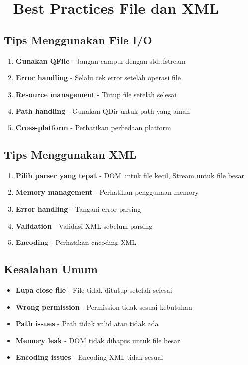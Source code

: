 \section{🔧 Best Practices File dan XML}

\subsection{Tips Menggunakan File I/O}

\begin{enumerate}
\item \textbf{Gunakan QFile} - Jangan campur dengan std::fstream
\item \textbf{Error handling} - Selalu cek error setelah operasi file
\item \textbf{Resource management} - Tutup file setelah selesai
\item \textbf{Path handling} - Gunakan QDir untuk path yang aman
\item \textbf{Cross-platform} - Perhatikan perbedaan platform
\end{enumerate}

\subsection{Tips Menggunakan XML}

\begin{enumerate}
\item \textbf{Pilih parser yang tepat} - DOM untuk file kecil, Stream untuk file besar
\item \textbf{Memory management} - Perhatikan penggunaan memory
\item \textbf{Error handling} - Tangani error parsing
\item \textbf{Validation} - Validasi XML sebelum parsing
\item \textbf{Encoding} - Perhatikan encoding XML
\end{enumerate}

\subsection{Kesalahan Umum}

\begin{itemize}
\item \textbf{Lupa close file} - File tidak ditutup setelah selesai
\item \textbf{Wrong permission} - Permission tidak sesuai kebutuhan
\item \textbf{Path issues} - Path tidak valid atau tidak ada
\item \textbf{Memory leak} - DOM tidak dihapus untuk file besar
\item \textbf{Encoding issues} - Encoding XML tidak sesuai
\end{itemize}

